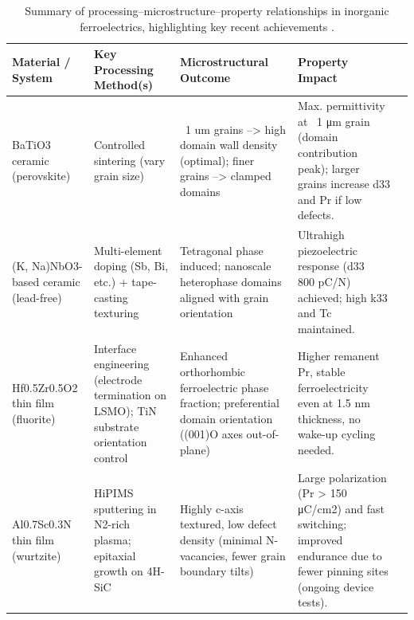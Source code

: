 \documentclass[a4paper,fleqn]{cas-sc}
\begin{document}
\begin{table}[h]
\centering
\caption{Summary of processing--microstructure--property relationships in inorganic ferroelectrics, highlighting key recent achievements \cite{tan2015unfolding,gao2021mechanism,zhu2025ultrahigh,shi2023interface,fan2025hidden,zhang2024new}.}
\label{tab:ferroelectrics}
\begin{tabular}{@{}>{\raggedright}p{3cm}>{\raggedright}p{3cm}p{3cm}p{3.5cm}c@{}}
\toprule
\textbf{Material / System} & \textbf{Key Processing Method(s)} & \textbf{Microstructural Outcome} & \textbf{Property Impact} & \\
\midrule
BaTiO3 ceramic (perovskite) & 
Controlled sintering (vary grain size) & 
~1 um grains --> high domain wall density (optimal); finer grains --> clamped domains & 
Max. permittivity at ~1 μm grain (domain contribution peak); larger grains increase d33 and Pr if low defects. & \\
\midrule
(K, Na)NbO3-based ceramic (lead-free) & 
Multi-element doping (Sb, Bi, etc.) + tape-casting texturing & 
Tetragonal phase induced; nanoscale heterophase domains aligned with grain orientation & 
Ultrahigh piezoelectric response (d33 ~ 800 pC/N) achieved; high k33 and Tc maintained. & \\
\midrule
Hf0.5Zr0.5O2 thin film (fluorite) & 
Interface engineering (electrode termination on LSMO); TiN substrate orientation control & 
Enhanced orthorhombic ferroelectric phase fraction; preferential domain orientation ((001)O axes out-of-plane) & 
Higher remanent Pr, stable ferroelectricity even at 1.5 nm thickness, no wake-up cycling needed. & \\
\midrule
Al0.7Sc0.3N thin film (wurtzite) & 
HiPIMS sputtering in N2-rich plasma; epitaxial growth on 4H-SiC & 
Highly c-axis textured, low defect density (minimal N-vacancies, fewer grain boundary tilts) & 
Large polarization (Pr > 150 μC/cm2) and fast switching; improved endurance due to fewer pinning sites (ongoing device tests). & \\
\bottomrule
\end{tabular}
\end{table}
\end{document}
